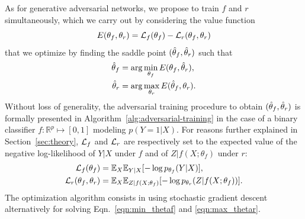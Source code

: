 \documentclass[twocolumn,superscriptaddress,aps]{revtex4-1}
\theoremstyle{plain}
\begin{document}
As for generative adversarial networks, we propose to
train $f$ and $r$ simultaneously, which we carry out by considering
the value function
\begin{equation}
    E(\theta_f, \theta_r) = {\cal L}_f(\theta_f) - {\cal L}_r(\theta_f, \theta_r)
\end{equation}
that we optimize by finding the saddle point $(\smash{\hat\theta_f}, \smash{\hat\theta_r})$ such that
\begin{align}
    \smash{\hat\theta_f} &= \arg \min_{\theta_f} E(\theta_f, \smash{\hat\theta_r}), \label{eqn:min_thetaf} \\
    \smash{\hat\theta_r} &= \arg \max_{\theta_r} E(\smash{\hat\theta_f}, \theta_r) \label{eqn:max_thetar}.
\end{align}
Without loss of generality, the adversarial training procedure to obtain
$(\smash{\hat\theta_f}, \smash{\hat\theta_r})$ is formally presented in
Algorithm~\ref{alg:adversarial-training} in the case of a binary classifier $f :
\mathbb{R}^p \mapsto [0,1]$ modeling $p(Y=1|X)$. For reasons further explained
in Section~\ref{sec:theory}, ${\cal L}_f$ and ${\cal L}_r$  are respectively set to the
expected value of the
negative log-likelihood of $Y|X$ under $f$ and of $Z|f(X;\theta_f)$ under
$r$:
\begin{align}
    {\cal L}_f(\theta_f) &= \mathbb{E}_{X} \mathbb{E}_{Y|X} [ -\log p_{\theta_f} (Y|X) ], \\
    {\cal L}_r(\theta_f, \theta_r) &= \mathbb{E}_{X}  \mathbb{E}_{Z|f(X;\theta_f)} [-\log p_{\theta_r} (Z|f(X;\theta_f))].
\end{align}
The optimization algorithm consists in using stochastic gradient descent
alternatively for solving Eqn.~\ref{eqn:min_thetaf} and \ref{eqn:max_thetar}.
\end{document}

